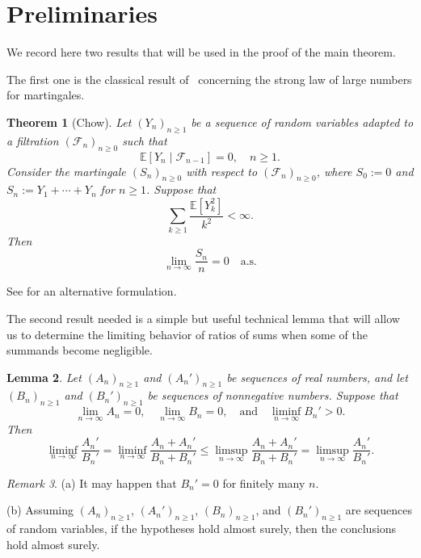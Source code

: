 \documentclass{article}
\newtheorem{theorem}{Theorem}[section]
\newtheorem{lemma}[theorem]{Lemma}
\theoremstyle{definition}
\theoremstyle{remark}
\newtheorem{remark}[theorem]{Remark}
\newcommand{\E}{\mathbb{E}}
\newcommand{\F}{\mathscr{F}}
\begin{document}
\section{Preliminaries}\label{sec:prelims}

We record here two results that will be used in the proof of the main theorem.  

The first one is the classical result of~\cite{Ch67} concerning the strong law of large numbers for martingales.

\begin{theorem}[Chow]\label{theorem:chow}
Let $(Y_n)_{n\ge 1}$ be a sequence of random variables adapted to a filtration $(\F_n)_{n\ge0}$ such that 
\[
\E[Y_n\mid \F_{n-1}]=0,\quad n\ge1.
\]
Consider the martingale $(S_n)_{n\ge 0}$ with respect to $(\F_n)_{n\ge0}$, where
$S_0:=0$ and $S_n:=Y_1+\cdots+Y_n$ for $n\ge1$.  Suppose that
    \[
        \sum_{k\ge 1} \frac{\E[Y_k^{2}]}{k^{2}} < \infty.
    \]
    Then
    \[
        \lim_{n\to\infty} \frac{S_n}{n} = 0\quad\text{a.s.}
    \]
\end{theorem}

See \cite{Cs68} for an alternative formulation.

The second result needed is a simple but useful technical lemma that will allow us to determine the limiting behavior of ratios of sums when some of the summands become negligible.

\begin{lemma}\label{lemma:technical}
Let $(A_n)_{n\ge1}$ and $(A_n')_{n\ge1}$ be sequences of real numbers, and let $(B_n)_{n\ge1}$ and $(B_n')_{n\ge1}$ be sequences of nonnegative numbers.  Suppose that
\[
    \lim_{n\to\infty} A_n = 0, \quad \lim_{n\to\infty} B_n = 0, \quad\text{and}\quad \liminf_{n\to\infty} B_n' > 0.
\]
Then
\[
    \liminf_{n\to\infty}\frac{A_n'}{B_n'}
    =
    \liminf_{n\to\infty}\frac{A_n+A_n'}{B_n+B_n'}
    \le
    \limsup_{n\to\infty}\frac{A_n+A_n'}{B_n+B_n'}
    =
    \limsup_{n\to\infty}\frac{A_n'}{B_n'}.
\]
\end{lemma}

\begin{remark}
(a) It may happen that $B_n'=0$ for finitely many $n$.

(b) Assuming $(A_n)_{n\ge1}$, $(A_n')_{n\ge1}$, $(B_n)_{n\ge1}$, and $(B_n')_{n\ge1}$ are sequences of random variables, if the hypotheses hold almost surely, then the conclusions hold almost surely.
\end{remark}
\end{document}
